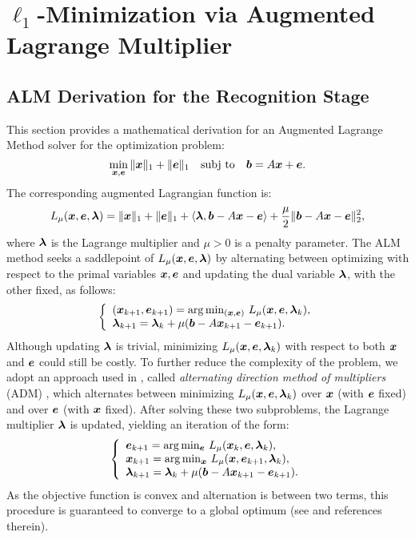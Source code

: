 \section{$\ell_1$-Minimization via Augmented Lagrange Multiplier} 
\label{sec:alm_derivation}

\subsection{ALM Derivation for the Recognition Stage}
This section provides a mathematical derivation for an Augmented Lagrange Method solver
for the optimization problem:
\begin{equation}
\min_{{\boldsymbol{x}}, \boldsymbol{e}} \| {\boldsymbol{x}} \|_1 + \|\boldsymbol{e}\|_1 \quad \textup{subj to} \quad \boldsymbol{b} =
A {\boldsymbol{x}} + \boldsymbol{e}.
\label{eqn:l1min_denoise}
\end{equation}
The corresponding augmented Lagrangian function is:
\begin{equation}
L_\mu ({\boldsymbol{x}},\boldsymbol{e},\boldsymbol{\lambda}) = \|{\boldsymbol{x}}\|_1 + \|\boldsymbol{e}\|_1 + \langle \boldsymbol{\lambda}, \boldsymbol{b}-A{\boldsymbol{x}} - \boldsymbol{e} \rangle + \frac{\mu}{2} \|\boldsymbol{b} - A{\boldsymbol{x}} - \boldsymbol{e}\|_2^2,
\end{equation}
where $\boldsymbol{\lambda}$ is the Lagrange multiplier and $\mu > 0$ is a
penalty parameter. The ALM method seeks a saddlepoint of $L_\mu
({\boldsymbol{x}},\boldsymbol{e},\boldsymbol{\lambda})$ by alternating between optimizing with respect
to the primal variables ${\boldsymbol{x}}, \boldsymbol{e}$ and updating the dual variable
$\boldsymbol{\lambda}$, with the other fixed, as follows:
\begin{equation}
\left \{
\begin{array}{lll}
({\boldsymbol{x}}_{k+1},\boldsymbol{e}_{k+1})  =  \arg\min_{({\boldsymbol{x}},\boldsymbol{e})} \, L_{\mu} ({\boldsymbol{x}},\boldsymbol{e},\boldsymbol{\lambda}_k),\\
\boldsymbol{\lambda}_{k+1}  =  \boldsymbol{\lambda}_k + \mu (\boldsymbol{b} - A{\boldsymbol{x}}_{k+1} - \boldsymbol{e}_{k+1}). \\
\end{array}
\right .
\label{eqn:alm}
\end{equation}
Although updating $\boldsymbol{\lambda}$ is trivial,
minimizing $L_{\mu} ({\boldsymbol{x}},\boldsymbol{e},\boldsymbol{\lambda}_k)$ with respect to both
${\boldsymbol{x}}$ and $\boldsymbol{e}$ could still be costly. To further reduce the
complexity of the problem, we adopt an approach used in
\cite{YangJ2009-pp}, called \emph{alternating direction
method of multipliers} (ADM) \cite{Glowinski1975-TR}, which alternates between minimizing $L_{\mu} ({\boldsymbol{x}},\boldsymbol{e},\boldsymbol{\lambda}_k)$
over ${\boldsymbol{x}}$ (with $\boldsymbol{e}$ fixed) and over $\boldsymbol{e}$ (with ${\boldsymbol{x}}$ fixed). After solving these two subproblems, the Lagrange multiplier $\boldsymbol{\lambda}$ is updated, yielding an iteration of the form:
\begin{equation}
\left \{
\begin{array}{lll}
\boldsymbol{e}_{k+1}  =  \arg\min_{\boldsymbol{e}} \, L_{\mu} ({\boldsymbol{x}}_k,\boldsymbol{e},\boldsymbol{\lambda}_k),\\
{\boldsymbol{x}}_{k+1}  =  \arg\min_{{\boldsymbol{x}}} \, L_{\mu} ({\boldsymbol{x}},\boldsymbol{e}_{k+1},\boldsymbol{\lambda}_k),\\
\boldsymbol{\lambda}_{k+1}  =  \boldsymbol{\lambda}_k + \mu (\boldsymbol{b} - A{\boldsymbol{x}}_{k+1} - \boldsymbol{e}_{k+1}). \\
\end{array}
\right .
\label{eqn:adm}
\end{equation}
As the objective function is convex and alternation is between two
terms, this procedure is guaranteed to converge to a global optimum (see \cite{YangJ2009-pp} and references therein).

